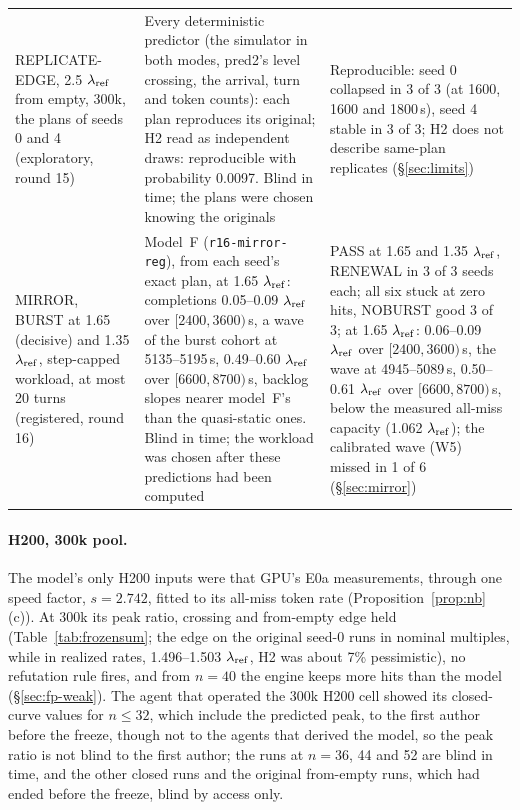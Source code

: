 \begin{table}[!tp]
\begin{tabular}{@{}>{\raggedright\arraybackslash}p{3.0cm} >{\raggedright\arraybackslash}p{7.4cm} >{\raggedright\arraybackslash}p{6.5cm}@{}}
\addlinespace[0.3pt]
REPLICATE-EDGE, 2.5 $\lambda_{\mathrm{ref}}$ from empty, 300k, the plans of seeds 0 and 4 (exploratory, round 15) & Every deterministic predictor (the simulator in both modes, pred2's level crossing, the arrival, turn and token counts): each plan reproduces its original; H2 read as independent draws: reproducible with probability 0.0097. Blind in time; the plans were chosen knowing the originals & Reproducible: seed 0 collapsed in 3 of 3 (at 1600, 1600 and 1800\,s), seed 4 stable in 3 of 3; H2 does not describe same-plan replicates (\S\ref{sec:limits})\\
\addlinespace[0.3pt]
MIRROR, BURST at 1.65 (decisive) and 1.35 $\lambda_{\mathrm{ref}}$, step-capped workload, at most 20 turns (registered, round 16) & Model~F (\texttt{r16-mirror-reg}), from each seed's exact plan, at 1.65 $\lambda_{\mathrm{ref}}$: completions 0.05--0.09 $\lambda_{\mathrm{ref}}$ over $[2400,3600)$\,s, a wave of the burst cohort at 5135--5195\,s, 0.49--0.60 $\lambda_{\mathrm{ref}}$ over $[6600,8700)$\,s, backlog slopes nearer model~F's than the quasi-static ones. Blind in time; the workload was chosen after these predictions had been computed & PASS at 1.65 and 1.35 $\lambda_{\mathrm{ref}}$, RENEWAL in 3 of 3 seeds each; all six stuck at zero hits, NOBURST good 3 of 3; at 1.65 $\lambda_{\mathrm{ref}}$: 0.06--0.09 $\lambda_{\mathrm{ref}}$ over $[2400,3600)$\,s, the wave at 4945--5089\,s, 0.50--0.61 $\lambda_{\mathrm{ref}}$ over $[6600,8700)$\,s, below the measured all-miss capacity (1.062 $\lambda_{\mathrm{ref}}$); the calibrated wave (W5) missed in 1 of 6 (\S\ref{sec:mirror})\\
\bottomrule
\end{tabular}
\end{table}

\paragraph{H200, 300k pool.} The model's only H200 inputs were that GPU's E0a measurements, through one speed factor, $s=2.742$, fitted to its all-miss token rate (Proposition~\ref{prop:nb}(c)). At 300k its peak ratio, crossing and from-empty edge held (Table~\ref{tab:frozensum}; the edge on the original seed-0 runs in nominal multiples, while in realized rates, 1.496--1.503 $\lambda_{\mathrm{ref}}$, H2 was about 7\% pessimistic), no refutation rule fires, and from $n=40$ the engine keeps more hits than the model (\S\ref{sec:fp-weak}). The agent that operated the 300k H200 cell showed its closed-curve values for $n\le32$, which include the predicted peak, to the first author before the freeze, though not to the agents that derived the model, so the peak ratio is not blind to the first author; the runs at $n=36$, 44 and 52 are blind in time, and the other closed runs and the original from-empty runs, which had ended before the freeze, blind by access only.

